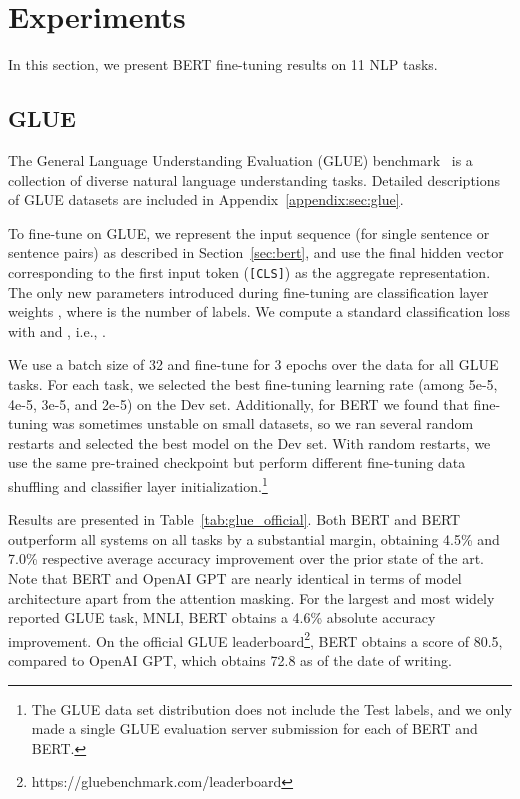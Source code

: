 \documentclass[11pt,a4paper]{article}
\newcommand\bertbase{BERT\xspace}
\newcommand\bertlarge{BERT\xspace}
\begin{document}
 \section{Experiments}
\label{sec:experiments}

In this section, we present BERT fine-tuning results on 11 NLP tasks. 

\subsection{GLUE}
\label{sec:glue}

The General Language Understanding Evaluation (GLUE) benchmark~\cite{wang-etal:2018:_glue} is a collection of diverse natural language understanding tasks.
Detailed descriptions of GLUE datasets are included in Appendix~\ref{appendix:sec:glue}.

To fine-tune on GLUE, we represent the input sequence (for single sentence or sentence pairs) as described in Section~\ref{sec:bert}, and use the final hidden vector  corresponding to the first input token ({\tt [CLS]}) as the aggregate representation.
The only new parameters introduced during fine-tuning are  classification layer weights , where  is the number of labels. We compute a standard classification loss with  and , i.e., .

We use a batch size of 32 and fine-tune for 3 epochs over the data for all GLUE tasks. For each task, we selected the best fine-tuning learning rate (among 5e-5, 4e-5, 3e-5, and 2e-5) on the Dev set. Additionally, for \bertlarge we found that fine-tuning was sometimes unstable on small datasets, so we ran several random restarts and selected the best model on the Dev set. With random restarts, we use the same pre-trained checkpoint but perform different fine-tuning data shuffling and classifier layer initialization.\footnote{The GLUE data set distribution does not include the Test labels, and we only made a single GLUE evaluation server submission for each of \bertbase and \bertlarge.}

Results are presented in Table~\ref{tab:glue_official}. Both \bertbase and \bertlarge outperform all systems on all tasks by a substantial margin, obtaining 4.5\% and 7.0\% respective average accuracy improvement over the prior state of the art. Note that \bertbase and OpenAI GPT are nearly identical in terms of model architecture apart from the attention masking. For the largest and most widely reported GLUE task, MNLI, BERT obtains a 4.6\% absolute accuracy improvement. On the official GLUE leaderboard\footnote{https://gluebenchmark.com/leaderboard},
\bertlarge obtains a score of 80.5, compared to OpenAI GPT, which obtains 72.8 as of the date of writing.
\end{document}
